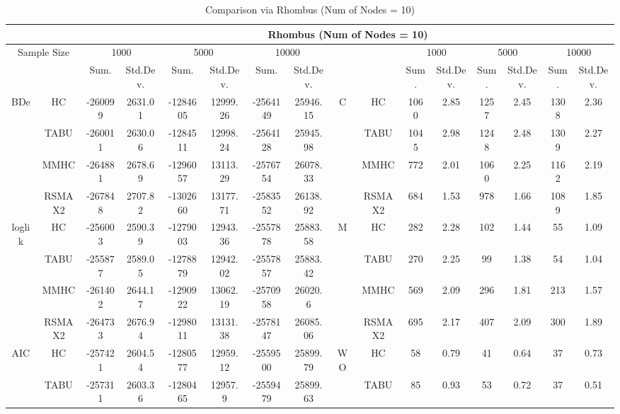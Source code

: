 \begin{table}[h]																										
\centering	\caption{Comparison via Rhombus (Num of Nodes = 10)}	\tiny																						
{\tabcolsep=0.01in																										
\begin{tabular}{cc||cc|cc|cc||cc|cc|cc|cc}																										
\hline																										
&	&	\multicolumn{14}{c}{Rhombus	(Num	of	Nodes	=	10)}\tabularnewline																			
\hline																										
\multicolumn{2}{c||}{Sample	Size}	&	\multicolumn{2}{c|}{1000}	&	\multicolumn{2}{c|}{5000}	&	\multicolumn{2}{c||}{10000}	&	&	&	\multicolumn{2}{c|}{1000}	&	\multicolumn{2}{c|}{5000}	&	\multicolumn{2}{c}{10000}\tabularnewline											
\hline																										
&	&	Sum.	&	Std.Dev.	&	Sum.	&	Std.Dev.	&	Sum.	&	Std.Dev.	&	&	&	Sum.	&	Std.Dev.	&	Sum.	&	Std.Dev.	&	Sum.	&	Std.Dev.\tabularnewline
\hline																										
\hline																										
\multirow{4}{*}{BDe} & HC &	-260099 & 	2631.01 & 	-1284605 & 	12999.26 & 	-2564149 & 	25946.15 & 	\multirow{4}{*}{C} & HC &	1060 & 	2.85 & 	1257 & 	2.45 & 	1308 & 	2.36\tabularnewline													
& TABU &	-260011 & 	2630.06 & 	-1284511 & 	12998.24 & 	-2564128 & 	25945.98 & 	& TABU &	1045 & 	2.98 & 	1248 & 	2.48 & 	1309 & 	2.27\tabularnewline													
& MMHC &	-264881 & 	2678.69 & 	-1296057 & 	13113.29 & 	-2576754 & 	26078.33 & 	& MMHC &	772 & 	2.01 & 	1060 & 	2.25 & 	1162 & 	2.19\tabularnewline													
& RSMAX2 &	-267848 & 	2707.82 & 	-1302660 & 	13177.71 & 	-2583552 & 	26138.92 & 	& RSMAX2 &	684 & 	1.53 & 	978 & 	1.66 & 	1089 & 	1.85\tabularnewline													
\hline																										
\multirow{4}{*}{loglik} & HC &	-256003 & 	2590.39 & 	-1279003 & 	12943.36 & 	-2557878 & 	25883.58 & 	\multirow{4}{*}{M} & HC &	282 & 	2.28 & 	102 & 	1.44 & 	55 & 	1.09\tabularnewline													
& TABU &	-255877 & 	2589.05 & 	-1278879 & 	12942.02 & 	-2557857 & 	25883.42 & 	& TABU &	270 & 	2.25 & 	99 & 	1.38 & 	54 & 	1.04\tabularnewline													
& MMHC &	-261402 & 	2644.17 & 	-1290922 & 	13062.19 & 	-2570958 & 	26020.6 & 	& MMHC &	569 & 	2.09 & 	296 & 	1.81 & 	213 & 	1.57\tabularnewline													
& RSMAX2 &	-264733 & 	2676.94 & 	-1298011 & 	13131.38 & 	-2578147 & 	26085.06 & 	& RSMAX2 &	695 & 	2.17 & 	407 & 	2.09 & 	300 & 	1.89\tabularnewline													
\hline																										
\multirow{4}{*}{AIC} & HC &	-257421 & 	2604.54 & 	-1280577 & 	12959.12 & 	-2559500 & 	25899.79 & 	\multirow{4}{*}{WO} & HC &	58 & 	0.79 & 	41 & 	0.64 & 	37 & 	0.73\tabularnewline													
& TABU &	-257311 & 	2603.36 & 	-1280465 & 	12957.9 & 	-2559479 & 	25899.63 & 	& TABU &	85 & 	0.93 & 	53 & 	0.72 & 	37 & 	0.51\tabularnewline													

\end{tabular}}
\end{table}
